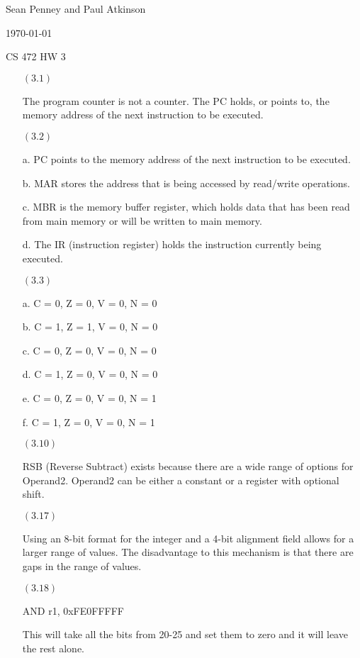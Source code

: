 \documentclass[letterpaper,10pt,titlepage]{article}
\def\name{Sean Penney and Paul Atkinson}
\begin{document}
\hfill \name

\hfill \today

\hfill CS 472 HW 3

\begin{enumerate}
\item[$(3.1)$] 

  The program counter is not a counter.  The PC holds, or points to, the memory address of the next instruction to be executed.

\item[$(3.2)$]

  a.  PC points to the memory address of the next instruction to be executed.
  
  b.  MAR stores the address that is being accessed by read/write operations.
  
  c.  MBR is the memory buffer register, which holds data that has been read from main memory or will be written to main memory.
  
  d.  The IR (instruction register) holds the instruction currently being executed.

\item[$(3.3)$]

  a.  C = 0, Z = 0, V = 0, N = 0
  
  b.  C = 1, Z = 1, V = 0, N = 0
  
  c.  C = 0, Z = 0, V = 0, N = 0
  
  d.  C = 1, Z = 0, V = 0, N = 0
  
  e.  C = 0, Z = 0, V = 0, N = 1
  
  f.  C = 1, Z = 0, V = 0, N = 1
  
\item[$(3.10)$]
  
  RSB (Reverse Subtract) exists because there are a wide range of options for Operand2. Operand2 can be either a constant or a 
  register with optional shift.
  
\item[$(3.17)$]

  Using an 8-bit format for the integer and a 4-bit alignment field allows for a larger range of values.
  The disadvantage to this mechanism is that there are gaps in the range of values.

\item[$(3.18)$]
  
  AND r1, 0xFE0FFFFF
  
  This will take all the bits from 20-25 and set them to zero and it will leave the rest alone.
  

\end{enumerate}
\end{document}
